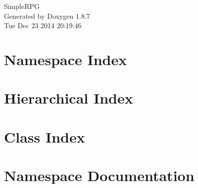 \documentclass[twoside]{book}
\newcommand{\+}{\discretionary{\mbox{\scriptsize$\hookleftarrow$}}{}{}}
\newcommand{\clearemptydoublepage}{%
  \newpage{\pagestyle{empty}\cleardoublepage}%
}
\begin{document}
\hypersetup{pageanchor=false,
             bookmarks=true,
             bookmarksnumbered=true,
             pdfencoding=unicode
            }
\begin{titlepage}
\vspace*{7cm}
\begin{center}%
{\Large Simple\+R\+P\+G }\\
\vspace*{1cm}
{\large Generated by Doxygen 1.8.7}\\
\vspace*{0.5cm}
{\small Tue Dec 23 2014 20:19:46}\\
\end{center}
\end{titlepage}
\clearemptydoublepage
\tableofcontents
\clearemptydoublepage
{}
\hypersetup{pageanchor=true}

\chapter{Namespace Index}

\chapter{Hierarchical Index}

\chapter{Class Index}

\chapter{Namespace Documentation}





\end{document}
